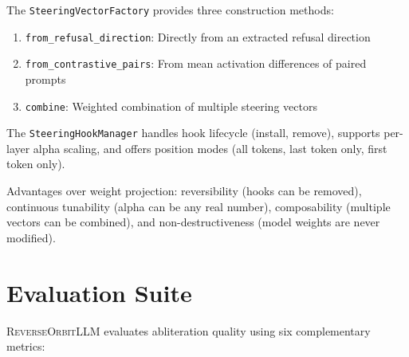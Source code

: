 \documentclass[11pt]{article}
\begin{document}
The \texttt{SteeringVectorFactory} provides three construction methods:
\begin{enumerate}
    \item \texttt{from\_refusal\_direction}: Directly from an extracted refusal direction
    \item \texttt{from\_contrastive\_pairs}: From mean activation differences of paired prompts
    \item \texttt{combine}: Weighted combination of multiple steering vectors
\end{enumerate}

The \texttt{SteeringHookManager} handles hook lifecycle (install, remove), supports per-layer alpha scaling, and offers position modes (all tokens, last token only, first token only).

Advantages over weight projection: reversibility (hooks can be removed), continuous tunability (alpha can be any real number), composability (multiple vectors can be combined), and non-destructiveness (model weights are never modified).

\section{Evaluation Suite}
\label{sec:evaluation}

\textsc{ReverseOrbitLLM} evaluates abliteration quality using six complementary metrics:
\end{document}
